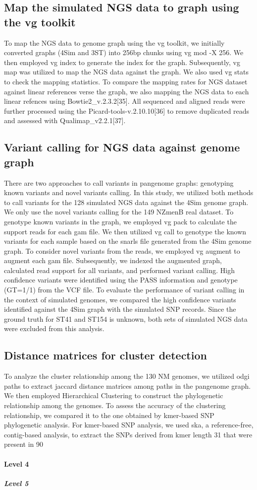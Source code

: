 \subsection{Map the simulated NGS data to graph using the vg toolkit}
To map the NGS data to genome graph using the vg toolkit, we initially converted graphs (4Sim and 3ST) into 256bp chunks using vg mod -X 256. We then employed vg index to generate the index for the graph. Subsequently, vg map was utilized to map the NGS data against the graph. We also used vg stats to check the mapping statistics. 
To compare the mapping rates for NGS dataset against linear references verse the graph, we also mapping the NGS data to each linear refences using Bowtie2_v.2.3.2[35]. All sequenced and aligned reads were further processed using the Picard-tools-v.2.10.10[36] to remove duplicated reads and assessed with Qualimap_v2.2.1[37].     
\subsection{Variant calling for NGS data against genome graph}
There are two approaches to call variants in pangenome graphs: genotyping known variants and novel variants calling. In this study, we utilized both methods to call variants for the 128 simulated NGS data against the 4Sim genome graph. We only use the novel variants calling for the 149 NZmenB real dataset. 
To genotype known variants in the graph, we employed vg pack to calculate the support reads for each gam file. We then utilized vg call to genotype the known variants for each sample based on the snarls file generated from the 4Sim genome graph.
To consider novel variants from the reads, we employed vg augment to augment each gam file. Subsequently, we indexed the augmented graph, calculated read support for all variants, and performed variant calling. High confidence variants were identified using the PASS information and genotype (GT=1/1) from the VCF file. To evaluate the performance of variant calling in the context of simulated genomes, we compared the high confidence variants identified against the 4Sim graph with the simulated SNP records. Since the ground truth for ST41 and ST154 is unknown, both sets of simulated NGS data were excluded from this analysis. 
\subsection{Distance matrices for cluster detection}
To analyze the cluster relationship among the 130 NM genomes, we utilized odgi paths to extract jaccard distance matrices among paths in the pangenome graph. We then employed Hierarchical Clustering to construct the phylogenetic relationship among the genomes. To assess the accuracy of the clustering relationship, we compared it to the one obtained by kmer-based SNP phylogenetic analysis.
For kmer-based SNP analysis, we used ska, a reference-free, contig-based analysis, to extract the SNPs derived from kmer length 31 that were present in 90%

\paragraph{Level 4}
\subparagraph{Level 5}
